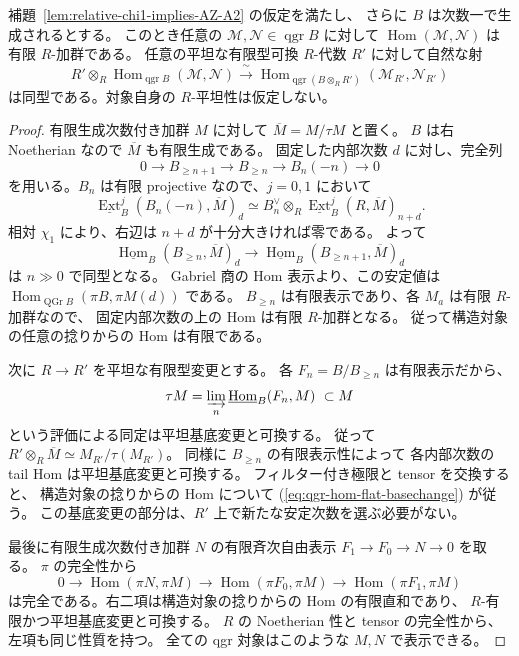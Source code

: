 \begin{lemma}
\label{lem:chi1-qgr-hom-finite-flat}
補題~\ref{lem:relative-chi1-implies-AZ-A2} の仮定を満たし、
さらに $B$ は次数一で生成されるとする。
このとき任意の $\mathcal M,\mathcal N\in\operatorname{qgr}B$ に対して
$\operatorname{Hom}(\mathcal M,\mathcal N)$ は有限 $R$-加群である。
任意の平坦な有限型可換 $R$-代数 $R'$ に対して自然な射
\[
 R'\otimes_R\operatorname{Hom}_{\operatorname{qgr}B}
      (\mathcal M,\mathcal N)
 \xrightarrow{\ \sim\ }
 \operatorname{Hom}_{\operatorname{qgr}(B\otimes_RR')}
      (\mathcal M_{R'},\mathcal N_{R'})
 \tag{Hom-flat-BC}\label{eq:qgr-hom-flat-basechange}
\]
は同型である。対象自身の $R$-平坦性は仮定しない。
\end{lemma}
\begin{proof}
有限生成次数付き加群 $M$ に対して
$\overline M=M/\tau M$ と置く。
$B$ は右 Noetherian なので $\overline M$ も有限生成である。
固定した内部次数 $d$ に対し、完全列
\[
 0\longrightarrow B_{\ge n+1}\longrightarrow B_{\ge n}
   \longrightarrow B_n(-n)\longrightarrow0
\]
を用いる。$B_n$ は有限 projective なので、$j=0,1$ において
\[
 \underline{\operatorname{Ext}}_B^j(B_n(-n),\overline M)_d
 \simeq B_n^\vee\otimes_R
       \underline{\operatorname{Ext}}_B^j(R,\overline M)_{n+d}.
\]
相対 $\chi_1$ により、右辺は $n+d$ が十分大きければ零である。
よって
\[
 \underline{\operatorname{Hom}}_B(B_{\ge n},\overline M)_d
 \longrightarrow
 \underline{\operatorname{Hom}}_B(B_{\ge n+1},\overline M)_d
\]
は $n\gg0$ で同型となる。
Gabriel 商の Hom 表示より、この安定値は
$\operatorname{Hom}_{\operatorname{QGr}B}(\pi B,\pi M(d))$ である。
$B_{\ge n}$ は有限表示であり、各 $M_a$ は有限 $R$-加群なので、
固定内部次数の上の Hom は有限 $R$-加群となる。
従って構造対象の任意の捻りからの Hom は有限である。

次に $R\to R'$ を平坦な有限型変更とする。
各 $F_n=B/B_{\ge n}$ は有限表示だから、
\[
 \tau M=\varinjlim_n
        \underline{\operatorname{Hom}}_B(F_n,M)
 \ \subset M
\]
という評価による同定は平坦基底変更と可換する。
従って $R'\otimes_R\overline M\simeq
M_{R'}/\tau(M_{R'})$。
同様に $B_{\ge n}$ の有限表示性によって
各内部次数の tail Hom は平坦基底変更と可換する。
フィルター付き極限と tensor を交換すると、
構造対象の捻りからの Hom について
(\ref{eq:qgr-hom-flat-basechange}) が従う。
この基底変更の部分は、$R'$ 上で新たな安定次数を選ぶ必要がない。

最後に有限生成次数付き加群 $N$ の有限斉次自由表示
$F_1\to F_0\to N\to0$ を取る。
$\pi$ の完全性から
\[
 0\longrightarrow\operatorname{Hom}(\pi N,\pi M)
 \longrightarrow\operatorname{Hom}(\pi F_0,\pi M)
 \longrightarrow\operatorname{Hom}(\pi F_1,\pi M)
\]
は完全である。右二項は構造対象の捻りからの Hom の有限直和であり、
$R$-有限かつ平坦基底変更と可換する。
$R$ の Noetherian 性と tensor の完全性から、左項も同じ性質を持つ。
全ての qgr 対象はこのような $M,N$ で表示できる。
\end{proof}

